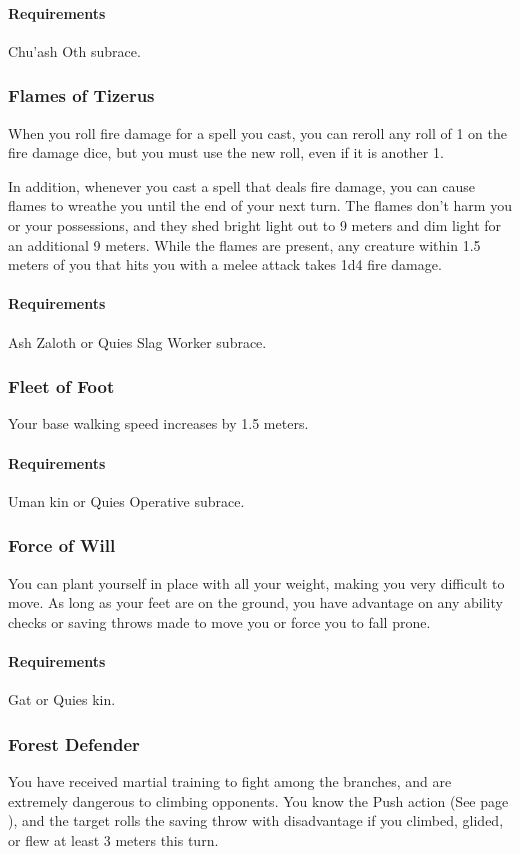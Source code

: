     \paragraph{Requirements} Chu'ash Oth subrace.
\subsubsection{Flames of Tizerus} \label{feat::flamesoftizerus}
    When you roll fire damage for a spell you cast, you can reroll any roll of 1 on the fire damage dice, but you must use the new roll, even if it is another 1.

    In addition, whenever you cast a spell that deals fire damage, you can cause flames to wreathe you until the end of your next turn.
    The flames don't harm you or your possessions, and they shed bright light out to 9 meters and dim light for an additional 9 meters.
    While the flames are present, any creature within 1.5 meters of you that hits you with a melee attack takes 1d4 fire damage.
    \paragraph{Requirements} Ash Zaloth or Quies Slag Worker subrace.
\subsubsection{Fleet of Foot} \label{feat::fleetoffoot}
    Your base walking speed increases by 1.5 meters.
    \paragraph{Requirements} Uman kin or Quies Operative subrace.
\subsubsection{Force of Will} \label{feat::forceofwill}
    You can plant yourself in place with all your weight, making you very difficult to move.
    As long as your feet are on the ground, you have advantage on any ability checks or saving throws made to move you or force you to fall prone.
    \paragraph{Requirements} Gat or Quies kin.
\subsubsection{Forest Defender} \label{feat::forestdefender}
    You have received martial training to fight among the branches, and are extremely dangerous to climbing opponents.
    You know the Push action (See page \pageref{act::push}), and the target rolls the saving throw with disadvantage if you climbed, glided, or flew at least 3 meters this turn.

